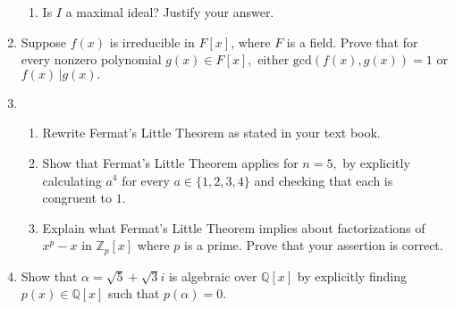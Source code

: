 \documentclass[12pt]{article}
\newcommand{\bbZ}{\mathbb{Z}}
\newcommand{\bbQ}{\mathbb{Q}}
\begin{document}
\begin{enumerate}
\begin{enumerate}
	\item Is $I$ a maximal ideal? Justify your answer.\\
	
	
	\end{enumerate}

\item Suppose $f(x)$ is irreducible in $F[x]$, where $F$ is a field. Prove that for every nonzero polynomial $g(x) \in F[x],$ either $\text{gcd}(f(x),g(x))=1$ or $f(x) \, \big\vert g(x).$

\item 
	\begin{enumerate}
	\item Rewrite Fermat's Little Theorem as stated in your text book.\\
	
	\item Show that Fermat's Little Theorem applies for $n=5,$ by explicitly calculating $a^{4}$ for every $a \in \{1,2,3,4\}$ and checking that each is congruent to $1.$\\
	
	\item Explain what Fermat's Little Theorem implies about factorizations of $x^p-x$ in $\bbZ_p[x]$ where $p$ is a prime. Prove that your assertion is correct.
	\end{enumerate}
	
\item Show that $\alpha=\sqrt{5}+\sqrt{3}i$ is algebraic over $\bbQ[x]$ by explicitly finding $p(x) \in \bbQ[x]$ such that $p(\alpha)=0.$

\end{enumerate}
\end{document}
